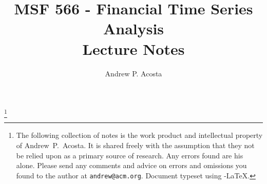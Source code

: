 \documentclass [11pt]{article}
\begin{document}
\pagestyle{myheadings}
\title{MSF 566 - Financial Time Series Analysis  \\ Lecture Notes}
\author{Andrew P. Acosta}

\maketitle
\thanks{The following collection of notes is the work product and intellectual property of \mbox{Andrew P. Acosta}. It is shared freely with the assumption that they not be relied upon as a primary source of research. Any errors found are his alone. Please send any comments and advice on errors and omissions you found to the author at \texttt{andrew@acm.org}. \linebreak
\tiny{Document typeset using \AmS{}-\LaTeX{}.}}

\tableofcontents
\clearpage
\listoffigures

\pagebreak
\listoftables

\pagebreak
\listofexamples
\clearpage




















\clearpage
{}
\printindex
\end{document}
